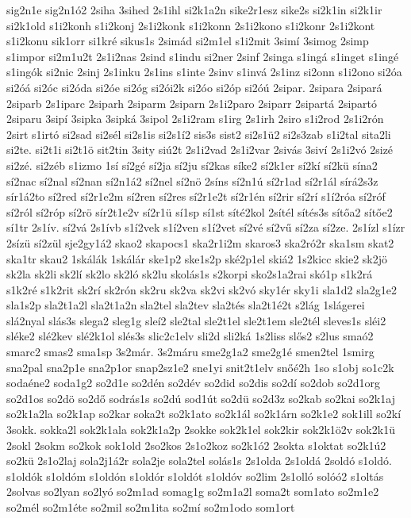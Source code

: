 {sig2n1e
sig2n1ó2
2siha
3sihed
2s1ihl
si2k1a2n
sike2r1esz
sike2s
si2k1in
si2k1ir
si2k1old
s1i2konh
s1i2konj
2s1i2konk
s1i2konn
2s1i2kono
s1i2konr
2s1i2kont
s1i2konu
sik1orr
si1kré
sikus1s
2simád
si2m1el
s1i2mit
3simí
3simog
2simp
s1impor
si2m1u2t
2s1i2nas
2sind
s1indu
si2ner
2sinf
2singa
s1ingá
s1inget
s1ingé
s1ingók
si2nic
2sinj
2s1inku
2s1ins
s1inte
2sinv
s1invá
2s1inz
si2onn
s1i2ono
si2óa
si2óá
si2óc
si2óda
si2óe
si2óg
si2ói2k
si2óo
si2óp
si2óú
2sipar.
2sipara
2sipará
2siparb
2s1iparc
2siparh
2siparm
2siparn
2s1i2paro
2siparr
2sipartá
2sipartó
2siparu
3sipí
3sipka
3sipká
3sipol
2s1i2ram
s1irg
2s1irh
2siro
s1i2rod
2s1i2rón
2sirt
s1irtó
si2sad
si2sél
si2s1is
si2s1í2
sis3s
sist2
si2s1ü2
si2s3zab
s1i2tal
sita2li
si2te.
si2t1i
si2t1ö
sit2tin
3sity
siú2t
2s1i2vad
2s1i2var
2sivás
3siví
2s1i2vó
2sizé
si2zé.
si2zéb
s1izmo
1sí
sí2gé
sí2ja
sí2ju
sí2kas
síke2
sí2k1er
sí2kí
sí2kü
sína2
sí2nac
sí2nal
sí2nan
sí2n1á2
sí2nel
sí2nö
2síns
sí2n1ú
sí2r1ad
sí2r1ál
sírá2s3z
sír1á2to
sí2red
sí2r1e2m
sí2ren
sí2res
sí2r1e2t
sí2r1én
sí2rir
sí2rí
s1í2róa
sí2róf
sí2ról
sí2róp
sí2rö
sír2t1e2v
sí2r1ü
sí1sp
sí1st
síté2kol
2sítél
sítés3s
sítőa2
sítőe2
sí1tr
2s1ív.
sí2vá
2s1ívb
s1í2vek
s1í2ven
s1í2vet
sí2vé
sí2vű
sí2za
sí2ze.
2s1ízl
s1ízr
2sízü
sí2zül
sje2gy1á2
skao2
skapocs1
ska2r1i2m
skaros3
ska2ró2r
ska1sm
skat2
ska1tr
skau2
1skálák
1skálár
ske1p2
ske1s2p
ské2p1el
skiá2
1s2kicc
skie2
sk2jö
sk2la
sk2li
sk2lí
sk2lo
sk2ló
sk2lu
skolás1s
s2korpi
sko2s1a2rai
skó1p
s1k2rá
s1k2ré
s1k2rit
sk2rí
sk2rón
sk2ru
sk2va
sk2vi
sk2vó
sky1ér
sky1i
sla1d2
sla2g1e2
sla1s2p
sla2t1a2l
sla2t1a2n
sla2tel
sla2tev
sla2tés
sla2t1é2t
s2lág
1slágerei
slá2nyal
slás3s
slega2
sleg1g
sleí2
sle2tal
sle2t1el
sle2t1em
sle2tél
sleves1s
sléi2
sléke2
slé2kev
slé2k1ol
slés3s
slic2c1elv
sli2d
sli2ká
1s2liss
slős2
s2lus
smaó2
smarc2
smas2
sma1sp
3s2már.
3s2máru
sme2g1a2
sme2g1é
smen2tel
1smirg
sna2pal
sna2p1e
sna2p1or
snap2sz1e2
sne1yi
snit2t1elv
snőé2h
1so
s1obj
so1c2k
sodaéne2
soda1g2
so2d1e
so2dén
so2dév
so2did
so2dis
so2dí
so2dob
so2d1org
so2d1os
so2dö
so2dő
sodrás1s
so2dú
sod1út
so2dü
so2d3z
so2kab
so2kai
so2k1aj
so2k1a2la
so2k1ap
so2kar
soka2t
so2k1ato
so2k1ál
so2k1árn
so2k1e2
sok1ill
so2kí
3sokk.
sokka2l
sok2k1ala
sok2k1a2p
2sokke
sok2k1el
sok2kir
sok2k1ö2v
sok2k1ü
2sokl
2sokm
so2kok
sok1old
2so2kos
2s1o2koz
so2k1ó2
2sokta
s1oktat
so2k1ú2
so2kü
2s1o2laj
sola2j1á2r
sola2je
sola2tel
solás1s
2s1olda
2s1oldá
2soldó
s1oldó.
s1oldók
s1oldóm
s1oldón
s1oldór
s1oldót
s1oldóv
so2lim
2s1olló
solóó2
s1oltás
2solvas
so2lyan
so2lyó
so2m1ad
somag1g
so2m1a2l
soma2t
som1ato
so2m1e2
so2mél
so2m1éte
so2mil
so2m1ita
so2mí
so2m1odo
som1ort
}
